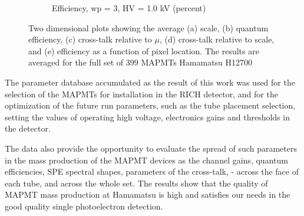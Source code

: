 \begin{figure}[hbt]
\begin{subfigure}[c]{0.24\linewidth}
		\caption{Efficiency, wp = 3, HV = 1.0 kV (percent)}
		\vspace{0mm}
	\end{subfigure}%
	\caption{Two dimensional plots showing the average (a) scale, (b) quantum efficiency, (c) cross-talk relative to $\mu$, (d) cross-talk relative to scale, and (e) efficiency as a function of pixel location. The results are averaged for the full set of 399 MAPMTs Hamamatsu H12700}
	\label{fig:2d_avg_fit_results}
\end{figure}



The parameter database accumulated as the result of this work was used for the selection of the MAPMTs for installation in the RICH detector, and for the optimization of the future run parameters, such as the tube placement selection, setting the values of operating high voltage, electronics gains and thresholds in the detector.


The data also provide the opportunity to evaluate the spread of such parameters in the mass production of the MAPMT devices as the channel gains, quantum efficiencies, SPE spectral shapes, parameters of the cross-talk, - across the face of each tube, and across the whole set. The results show that the quality of MAPMT mass production at Hamamatsu is high and satisfies our needs in the good quality single photoelectron detection.




